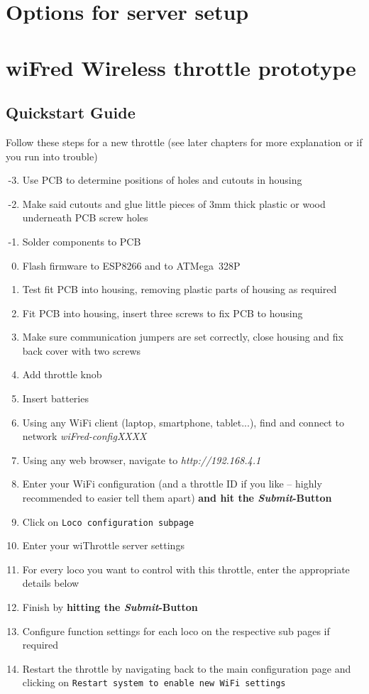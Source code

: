 \documentclass[11pt,a4paper]{scrartcl}
\begin{document}
\clearpage

\section{Options for server setup}

\clearpage

\section{wiFred Wireless throttle prototype} \label{oldThrottle}

\subsection{Quickstart Guide}

Follow these steps for a new throttle (see later chapters for more explanation or if you run into trouble)

\begin{enumerate}
\setcounter{enumi}{-4}
\item Use PCB to determine positions of holes and cutouts in housing
\item Make said cutouts and glue little pieces of 3mm thick plastic or wood underneath PCB screw holes  
\item Solder components to PCB
\item Flash firmware to ESP8266 and to ATMega~328P
\item Test fit PCB into housing, removing plastic parts of housing as required
\item Fit PCB into housing, insert three screws to fix PCB to housing
\item Make sure communication jumpers are set correctly, close housing and fix back cover with two screws
\item Add throttle knob
\item Insert batteries
\item Using any WiFi client (laptop, smartphone, tablet...), find and connect to network \textit{wiFred-configXXXX}
\item Using any web browser, navigate to \textit{http://192.168.4.1}
\item Enter your WiFi configuration (and a throttle ID if you like -- highly recommended to easier tell them apart) \textbf{and hit the \textit{Submit}-Button}
\item Click on \texttt{Loco configuration subpage}
\item Enter your wiThrottle server settings
\item For every loco you want to control with this throttle, enter the appropriate details below
\item Finish by \textbf{hitting the \textit{Submit}-Button}
\item Configure function settings for each loco on the respective sub pages if required
\item Restart the throttle by navigating back to the main configuration page and clicking on \texttt{Restart system to enable new WiFi settings}
\end{enumerate}
\end{document}
